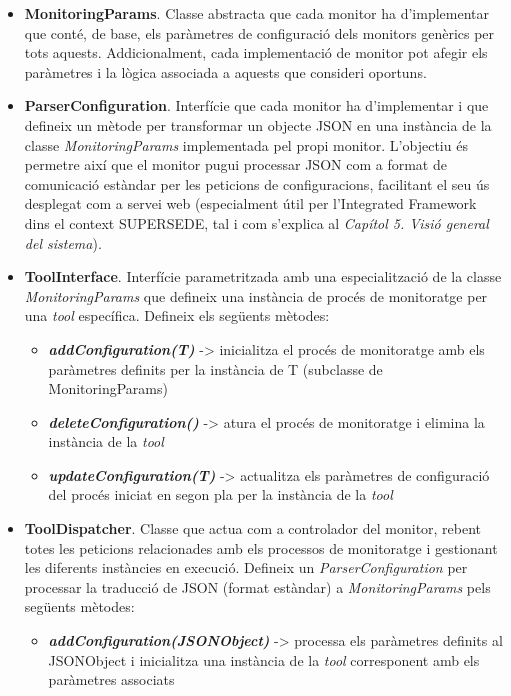 \begin{itemize}
\item \textbf{MonitoringParams}. Classe abstracta que cada monitor ha d'implementar que conté, de base, els paràmetres de configuració dels monitors genèrics per tots aquests. Addicionalment, cada implementació de monitor pot afegir els paràmetres i la lògica associada a aquests que consideri oportuns.
\item \textbf{ParserConfiguration}. Interfície que cada monitor ha d'implementar i que defineix un mètode per transformar un objecte JSON en una instància de la classe \textit{MonitoringParams} implementada pel propi monitor. L'objectiu és permetre així que el monitor pugui processar JSON com a format de comunicació estàndar per les peticions de configuracions, facilitant el seu ús desplegat com a servei web (especialment útil per l'Integrated Framework dins el context SUPERSEDE, tal i com s'explica al \textit{Capítol 5. Visió general del sistema}).
\item \textbf{ToolInterface}. Interfície parametritzada amb una especialització de la classe \textit{MonitoringParams} que defineix una instància de procés de monitoratge per una \textit{tool} específica. Defineix els següents mètodes:
\begin{itemize}
\item \textbf{\textit{addConfiguration(T)}} -> inicialitza el procés de monitoratge amb els paràmetres definits per la instància de T (subclasse de MonitoringParams)
\item \textbf{\textit{deleteConfiguration()}} -> atura el procés de monitoratge i elimina la instància de la \textit{tool}
\item \textbf{\textit{updateConfiguration(T)}} -> actualitza els paràmetres de configuració del procés iniciat en segon pla per la instància de la \textit{tool}
\end{itemize}
\item \textbf{ToolDispatcher}. Classe que actua com a controlador del monitor, rebent totes les peticions relacionades amb els processos de monitoratge i gestionant les diferents instàncies en execució. Defineix un \textit{ParserConfiguration} per processar la traducció de JSON (format estàndar) a \textit{MonitoringParams} pels següents mètodes:
\begin{itemize}
\item \textbf{\textit{addConfiguration(JSONObject)}} -> processa els paràmetres definits al JSONObject i inicialitza una instància de la \textit{tool} corresponent amb els paràmetres associats

\end{itemize}
\end{itemize}
